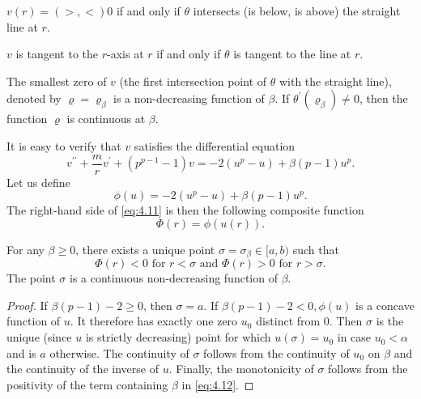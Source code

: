 \begin{lemma}\label{lemma:21}
  $v(r)=(>,<) 0$ if and only if $\theta$ intersects (is below, is above)
  the straight line at $r$.

  $v$ is tangent to the $r$-axis at $r$ if and only if $\theta$ is tangent to the line at $r$.
  
  The smallest zero of $v$ (the first intersection point of $\theta$ with the straight line), 
  denoted by $\varrho=\varrho_\beta$ is a non-decreasing function of $\beta$.
  If $\theta^{\prime}\left(\varrho_\beta\right) \neq 0$, then the function $\varrho$ is 
  continuous at $\beta$.
\end{lemma}

It is easy to verify that $v$ satisfies the differential equation
\begin{equation}\label{eq:4.11}
  v^{\prime \prime}+\frac{m}{r} v^{\prime}+\left(p^{p-1}-1\right) v 
    = -2\left(u^p-u\right)+\beta(p-1) u^p.
\end{equation}
Let us define
\begin{equation}\label{eq:4.12}
  \phi(u)=-2\left(u^p-u\right)+\beta(p-1) u^p .  
\end{equation}
The right-hand side of \eqref{eq:4.11} is then the following composite function
\[\Phi(r)=\phi(u(r)).\]

\begin{lemma}\label{lemma:22}
  For any $\beta \geq 0$, there exists a unique point $\sigma=\sigma_\beta \in[a, b)$
  such that
  \begin{equation}\label{eq:4.13}
    \Phi(r)<0 \text { for } r<\sigma \text { and } \Phi(r)>0 \text { for } r>\sigma.  
  \end{equation}
  The point $\sigma$ is a continuous non-decreasing function of $\beta$.
\end{lemma}

\begin{proof}
  If $\beta(p-1)-2 \geq 0$, then $\sigma=a$. If $\beta(p-1)-2<0, \phi(u)$
  is a concave function of $u$. It therefore has exactly one zero $u_0$ distinct from 0.
  Then $\sigma$ is the unique (since $u$ is strictly decreasing) point 
  for which $u(\sigma)=u_0$ in case $u_0<\alpha$ and is $a$ otherwise.
  The continuity of $\sigma$ follows from the continuity of $u_0$ on $\beta$
  and the continuity of the inverse of $u$. Finally, the monotonicity of $\sigma$
  follows from the positivity of the term containing $\beta$ in \eqref{eq:4.12}.
\end{proof}

